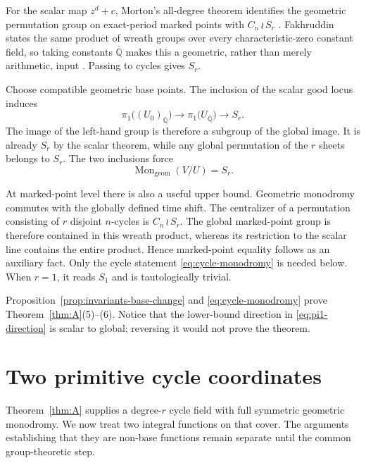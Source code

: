 \documentclass[11pt]{article}
\theoremstyle{definition}
\theoremstyle{remark}
\newcommand{\Qbar}{\overline{\mathbb{Q}}}
\newcommand{\Mon}{\operatorname{Mon}}
\newcommand{\wrp}{\mathbin{\wr}}
\begin{document}
For the scalar map $z^d+c$, Morton's all-degree theorem identifies the
geometric permutation group on exact-period marked points with
$C_n\wrp S_r$ \citep{morton-1998-periodic-galois}.  Fakhruddin states the
same product of wreath groups over every characteristic-zero constant field,
so taking constants $\Qbar$ makes this a geometric, rather than merely
arithmetic, input \citep{fakhruddin-2014-generic-endomorphisms}.  Passing to
cycles gives $S_r$.

Choose compatible geometric base points.  The inclusion of the scalar good
locus induces
\begin{equation}\label{eq:pi1-direction}
 \pi_1\bigl((U_0)_{\Qbar}\bigr)
 \longrightarrow
 \pi_1\bigl(U_{\Qbar}\bigr)
 \longrightarrow S_r.
\end{equation}
The image of the left-hand group is therefore a subgroup of the global
image.  It is already $S_r$ by the scalar theorem, while any global
permutation of the $r$ sheets belongs to $S_r$.  The two inclusions force
\begin{equation}\label{eq:cycle-monodromy}
 \Mon_{\mathrm{geom}}(V/U)=S_r.
\end{equation}

At marked-point level there is also a useful upper bound.  Geometric
monodromy commutes with the globally defined time shift.  The centralizer of
a permutation consisting of $r$ disjoint $n$-cycles is
$C_n\wrp S_r$.  The global marked-point group is therefore contained in
this wreath product, whereas its restriction to the scalar line contains the
entire product.  Hence marked-point equality follows as an auxiliary fact.
Only the cycle statement \eqref{eq:cycle-monodromy} is needed below.  When
$r=1$, it reads $S_1$ and is tautologically trivial.

Proposition~\ref{prop:invariants-base-change} and
\eqref{eq:cycle-monodromy} prove Theorem~\ref{thm:A}(5)--(6).  Notice that
the lower-bound direction in \eqref{eq:pi1-direction} is scalar to global;
reversing it would not prove the theorem.

\section{Two primitive cycle coordinates}\label{sec:coordinates}

Theorem~\ref{thm:A} supplies a degree-$r$ cycle field with full symmetric
geometric monodromy.  We now treat two integral functions on that cover.  The
arguments establishing that they are non-base functions remain separate
until the common group-theoretic step.
\end{document}
